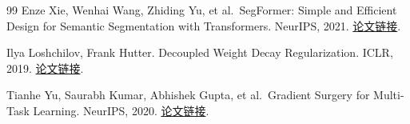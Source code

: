 \documentclass[UTF8,a4paper,zihao=-4,fontset=none]{ctexart}
\begin{document}
\begin{thebibliography}{99}
Enze Xie, Wenhai Wang, Zhiding Yu, et al.~SegFormer: Simple and Efficient Design for Semantic Segmentation with Transformers. NeurIPS, 2021. \href{https://arxiv.org/abs/2105.15203}{论文链接}.

Ilya Loshchilov, Frank Hutter. Decoupled Weight Decay Regularization. ICLR, 2019. \href{https://arxiv.org/abs/1711.05101}{论文链接}.

Tianhe Yu, Saurabh Kumar, Abhishek Gupta, et al.~Gradient Surgery for Multi-Task Learning. NeurIPS, 2020. \href{https://arxiv.org/abs/2001.06782}{论文链接}.
\end{thebibliography}
\end{document}

